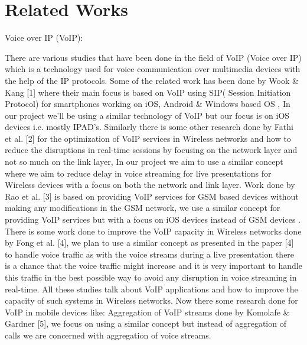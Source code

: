 \section{Related Works}

Voice over IP (VoIP):

There are various studies that have been done in the field of VoIP (Voice over IP) which is a technology used for voice communication over multimedia devices with the help of the IP protocols. Some of the related work has been done by Wook \& Kang [1] where their main focus is based on VoIP using SIP( Session Initiation Protocol) for smartphones working on iOS, Android \& Windows based OS , In our project we’ll be using a similar technology of VoIP but our focus is on iOS devices i.e. mostly IPAD’s. Similarly there is some other research done by Fathi et al. [2] for the optimization of VoIP services in Wireless networks and how to reduce the disruptions in real-time sessions by focusing on the network layer and not so much on the link layer, In our project we aim to use a similar concept where we aim to reduce delay in voice streaming for live presentations for Wireless devices with a focus on both the network and link layer. Work done by Rao et al. [3] is based on providing VoIP services for GSM based devices without making any modifications in the GSM network, we use a similar concept for providing VoIP services but with a focus on iOS devices instead of GSM devices . 
There is some work done to improve the VoIP capacity in Wireless networks done by Fong et al. [4], we plan to use a similar concept as presented in the paper [4] to handle voice traffic as with the voice streams during a live presentation there is a chance that the voice traffic might increase and it is very important to handle this traffic in the best possible way to avoid any disruption in voice streaming in real-time. All these studies talk about VoIP applications and how to improve the capacity of such systems in Wireless networks.
Now there some research done for VoIP in mobile devices like: Aggregation of VoIP streams done by Komolafe \& Gardner [5], we focus on using a similar concept but instead of aggregation of calls we are concerned with aggregation of voice streams.
